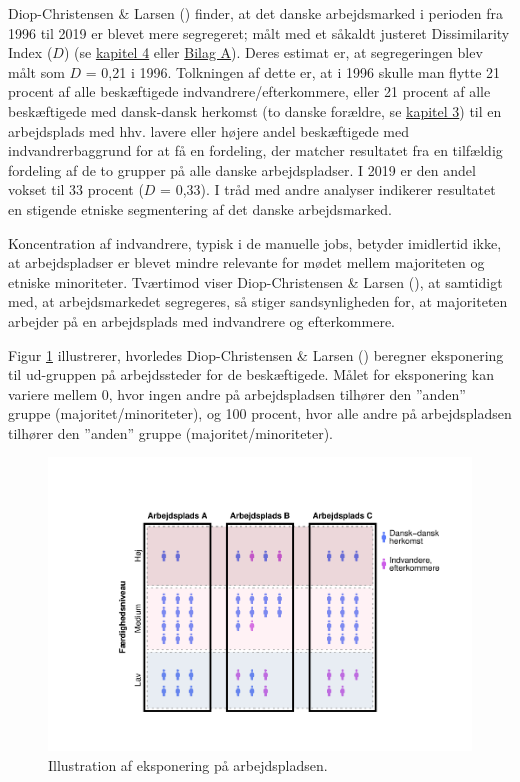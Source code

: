 \documentclass[
]{book}
\begin{document}
Diop-Christensen \& Larsen () finder, at det danske arbejdsmarked i perioden fra 1996 til 2019 er blevet mere segregeret; målt med et såkaldt justeret Dissimilarity Index (\(D\)) (se \hyperref[kap4]{kapitel 4} eller \hyperref[bilagA]{Bilag A}). Deres estimat er, at segregeringen blev målt som \(D\) = 0,21 i 1996. Tolkningen af dette er, at i 1996 skulle man flytte 21 procent af alle beskæftigede indvandrere/efterkommere, eller 21 procent af alle beskæftigede med dansk-dansk herkomst (to danske forældre, se \hyperref[kap2]{kapitel 3}) til en arbejdsplads med hhv. lavere eller højere andel beskæftigede med indvandrerbaggrund for at få en fordeling, der matcher resultatet fra en tilfældig fordeling af de to grupper på alle danske arbejdspladser. I 2019 er den andel vokset til 33 procent (\(D\) = 0,33). I tråd med andre analyser indikerer resultatet en stigende etniske segmentering af det danske arbejdsmarked.

Koncentration af indvandrere, typisk i de manuelle jobs, betyder imidlertid ikke, at arbejdspladser er blevet mindre relevante for mødet mellem majoriteten og etniske minoriteter. Tværtimod viser Diop-Christensen \& Larsen (), at samtidigt med, at arbejdsmarkedet segregeres, så stiger sandsynligheden for, at majoriteten arbejder på en arbejdsplads med indvandrere og efterkommere.

Figur \ref{fig:fig-5-1} illustrerer, hvorledes Diop-Christensen \& Larsen () beregner eksponering til ud-gruppen på arbejdssteder for de beskæftigede. Målet for eksponering kan variere mellem 0, hvor ingen andre på arbejdspladsen tilhører den ''anden'' gruppe (majoritet/minoriteter), og 100 procent, hvor alle andre på arbejdspladsen tilhører den ''anden'' gruppe (majoritet/minoriteter).

\begin{figure}
\includegraphics[width=1\linewidth]{en-befolkning-blander-sig_files/figure-latex/fig-5-1-1} \caption{Illustration af eksponering på arbejdspladsen.}\label{fig:fig-5-1}
\end{figure}
\end{document}
